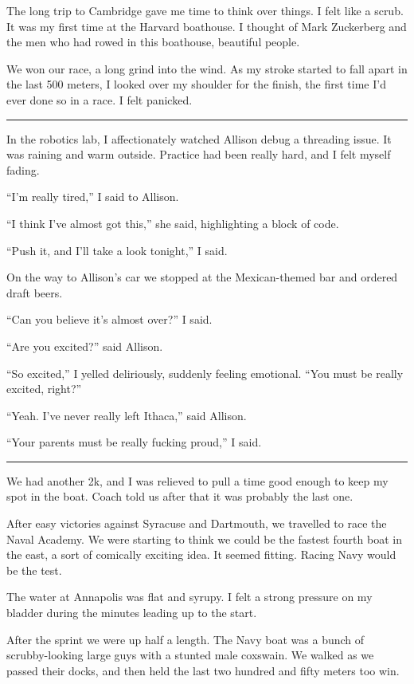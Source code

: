 The long trip to Cambridge gave me time to think over things.  I felt like a
scrub.  It was my first time at the Harvard boathouse.  I thought of Mark
Zuckerberg and the men who had rowed in this boathouse, beautiful people. 

We won our race, a long grind into the wind.  As my stroke started to fall apart
in the last 500 meters, I looked over my shoulder for the finish, the first time
I'd ever done so in a race.  I felt panicked.

\plainfancybreak{12pt}{2}{}

In the robotics lab, I affectionately watched Allison debug a threading issue.
It was raining and warm outside.  Practice had been really hard, and I felt
myself fading.

``I'm really tired,'' I said to Allison.

``I think I've almost got this,'' she said, highlighting a block of code.

``Push it, and I'll take a look tonight,'' I said.

On the way to Allison's car we stopped at the Mexican-themed bar and ordered
draft beers.

``Can you believe it's almost over?'' I said.

``Are you excited?'' said Allison.

``So excited,'' I yelled deliriously, suddenly feeling emotional.  ``You must be
really excited, right?''

``Yeah.  I've never really left Ithaca,'' said Allison.

``Your parents must be really fucking proud,'' I said.

\plainfancybreak{12pt}{2}{}


We had another 2k, and I was relieved to pull a time good enough to keep my spot
in the boat.  Coach told us after that it was probably the last one.

After easy victories against Syracuse and Dartmouth, we travelled to race the
Naval Academy.  We were starting to think we could be the fastest fourth boat in
the east, a sort of comically exciting idea.  It seemed fitting.  Racing
Navy would be the test.

The water at Annapolis was flat and syrupy.  I felt a strong pressure on my
bladder during the minutes leading up to the start.   

After the sprint we were up half a length.  The Navy boat was a bunch of
scrubby-looking large guys with a stunted male coxswain.  We walked as we passed
their docks, and then held the last two hundred and fifty meters too win.  

